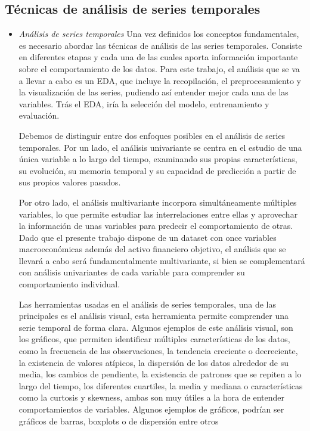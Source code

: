 \subsection{Técnicas de análisis de series temporales}
\begin{itemize}
    \item \emph{Análisis de series temporales}
    Una vez definidos los conceptos fundamentales, es necesario abordar las técnicas de análisis de las series temporales. Consiste en diferentes etapas y cada una de las cuales aporta información importante sobre el comportamiento de los datos. Para este trabajo, el análisis que se va a llevar a cabo es un EDA, que incluye la recopilación, el preprocesamiento y la visualización de las series, pudiendo así entender mejor cada una de las variables. Trás el EDA, iría la selección del modelo, entrenamiento y evaluación.

    Debemos de distinguir entre dos enfoques posibles en el análisis de series temporales. Por un lado, el análisis univariante se centra en el estudio de una única variable a lo largo del tiempo, examinando sus propias características, su evolución, su memoria temporal y su capacidad de predicción a partir de sus propios valores pasados. 
    
    Por otro lado, el análisis multivariante incorpora simultáneamente múltiples variables, lo que permite estudiar las interrelaciones entre ellas y aprovechar la información de unas variables para predecir el comportamiento de otras. Dado que el presente trabajo dispone de un dataset con once variables macroeconómicas además del activo financiero objetivo, el análisis que se llevará a cabo será fundamentalmente multivariante, si bien se complementará con análisis univariantes de cada variable para comprender su comportamiento individual.

    Las herramientas usadas en el análisis de series temporales, una de las principales es el análisis visual, esta herramienta permite comprender una serie temporal de forma clara. Algunos ejemplos de este análisis visual, son los gráficos, que permiten identificar múltiples características de los datos, como la frecuencia de las observaciones, la tendencia creciente o decreciente, la existencia de valores atípicos, la dispersión de los datos alrededor de su media, los cambios de pendiente, la existencia de patrones que se repiten a lo largo del tiempo, los diferentes cuartiles, la media y mediana o características como la curtosis y skewness, ambas son muy útiles a la hora de entender comportamientos de variables. Algunos ejemplos de gráficos, podrían ser gráficos de barras, boxplots o de dispersión entre otros


\end{itemize}
